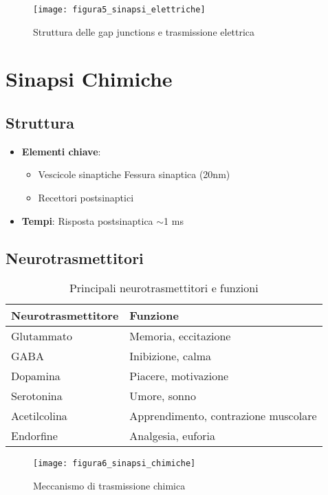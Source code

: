 \documentclass{article}
\begin{document}
\begin{figure}[h]
\centering
\texttt{[image: figura5\_sinapsi\_elettriche]}
\caption{Struttura delle gap junctions e trasmissione elettrica}
\label{fig:elettriche}
\end{figure}

\section{Sinapsi Chimiche}
\subsection{Struttura}
\begin{itemize}
\item \textbf{Elementi chiave}:
  \begin{itemize}
  \item Vescicole sinaptiche
  \ta Fessura sinaptica (20nm)
  \item Recettori postsinaptici
  \end{itemize}
\item \textbf{Tempi}: Risposta postsinaptica $\sim$1 ms
\end{itemize}

\subsection{Neurotrasmettitori}
\begin{table}[h]
\centering
\caption{Principali neurotrasmettitori e funzioni}
\begin{tabular}{ll}
\toprule
\textbf{Neurotrasmettitore} & \textbf{Funzione} \\
\midrule
Glutammato & Memoria, eccitazione \\
GABA & Inibizione, calma \\
Dopamina & Piacere, motivazione \\
Serotonina & Umore, sonno \\
Acetilcolina & Apprendimento, contrazione muscolare \\
Endorfine & Analgesia, euforia \\
\bottomrule
\end{tabular}
\label{tab:neurotrasmettitori}
\end{table}

\begin{figure}[h]
\centering
\texttt{[image: figura6\_sinapsi\_chimiche]}
\caption{Meccanismo di trasmissione chimica}
\label{fig:chimiche}
\end{figure}
\end{document}
